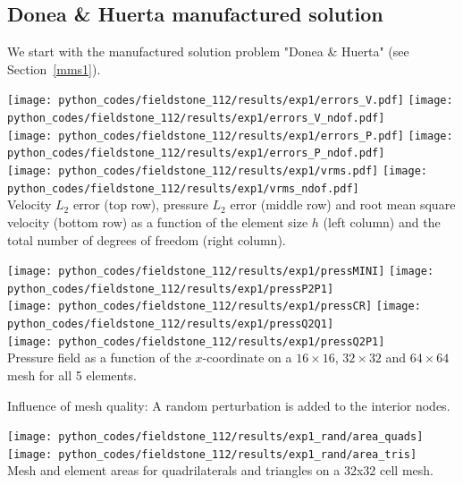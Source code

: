 \newpage
\subsection*{Donea \& Huerta manufactured solution}

We start with the manufactured solution problem "Donea \& Huerta" (see Section~\ref{mms1}).

\begin{center}
\texttt{[image: python\_codes/fieldstone\_112/results/exp1/errors\_V.pdf]}
\texttt{[image: python\_codes/fieldstone\_112/results/exp1/errors\_V\_ndof.pdf]}\\
\texttt{[image: python\_codes/fieldstone\_112/results/exp1/errors\_P.pdf]}
\texttt{[image: python\_codes/fieldstone\_112/results/exp1/errors\_P\_ndof.pdf]}\\
\texttt{[image: python\_codes/fieldstone\_112/results/exp1/vrms.pdf]}
\texttt{[image: python\_codes/fieldstone\_112/results/exp1/vrms\_ndof.pdf]}\\
{\captionfont Velocity $L_2$ error (top row), pressure $L_2$ error (middle row) and root
mean square velocity (bottom row) as a function of the element size $h$ (left column) 
and the total number of degrees of freedom (right column).}
\end{center}

\newpage
\begin{center}
\texttt{[image: python\_codes/fieldstone\_112/results/exp1/pressMINI]}
\texttt{[image: python\_codes/fieldstone\_112/results/exp1/pressP2P1]}\\
\texttt{[image: python\_codes/fieldstone\_112/results/exp1/pressCR]}
\texttt{[image: python\_codes/fieldstone\_112/results/exp1/pressQ2Q1]}\\
\texttt{[image: python\_codes/fieldstone\_112/results/exp1/pressQ2P1]}\\
{\captionfont Pressure field as a function of the $x$-coordinate on a $16\times16$,
$32\times 32$ and $64\times 64$ mesh for all 5 elements.} 
\end{center}

\newpage

Influence of mesh quality:
A random perturbation is added to the interior nodes. 

\begin{center}
\texttt{[image: python\_codes/fieldstone\_112/results/exp1\_rand/area\_quads]}
\texttt{[image: python\_codes/fieldstone\_112/results/exp1\_rand/area\_tris]}\\
{\captionfont Mesh and element areas for quadrilaterals and triangles on a 32x32 cell mesh.}
\end{center}

